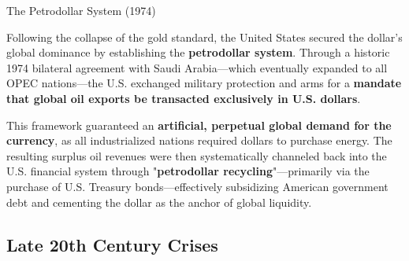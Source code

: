 \documentclass[10pt]{article}
\begin{document}
    \begin{core}[label=core:petrodollar]{The Petrodollar System (1974)}

      Following the collapse of the gold standard, the United States secured the dollar's global dominance by establishing the \textbf{petrodollar system}. Through a historic 1974 bilateral agreement with Saudi Arabia---which eventually expanded to all OPEC nations---the U.S. exchanged military protection and arms for a \textbf{mandate that global oil exports be transacted exclusively in U.S. dollars}.


      This framework guaranteed an \textbf{artificial, perpetual global demand for the currency}, as all industrialized nations required dollars to purchase energy. The resulting surplus oil revenues were then systematically channeled back into the U.S. financial system through "\textbf{petrodollar recycling}"---primarily via the purchase of U.S. Treasury bonds---effectively subsidizing American government debt and cementing the dollar as the anchor of global liquidity.

    \end{core}

  \subsection{Late 20th Century Crises}
\end{document}
